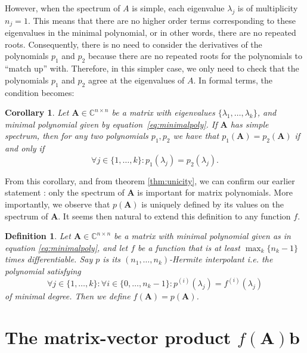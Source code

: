 \documentclass[11pt]{article}
\newtheorem{definition}{Definition}
\newtheorem{corollary}{Corollary}[theorem]
\numberwithin{equation}{section}
\begin{document}
However, when the spectrum of $A$ is simple, each eigenvalue $\lambda_j$ is of multiplicity $n_j=1$. This means that there are no higher order terms corresponding to these eigenvalues in the minimal polynomial, or in other words, there are no repeated roots. Consequently, there is no need to consider the derivatives of the polynomials $p_1$ and $p_2$ because there are no repeated roots for the polynomials to ``match up'' with. Therefore, in this simpler case, we only need to check that the polynomials $p_1$ and $p_2$ agree at the eigenvalues of $A$. In formal terms, the condition becomes:
\begin{corollary}\label{cor:unicity}
Let $\mathbf{A}\in \mathbb{C}^{n\times n}$ be a matrix with eigenvalues $\{\lambda_1,\ldots,\lambda_k\}$, and minimal polynomial given by equation~\ref{eq:minimalpoly}. If $\mathbf{A}$ has simple spectrum, then for any two polynomials $p_1,p_2$ we have that $p_1(\mathbf{A})=p_2(\mathbf{A})$ if and only if
\begin{equation*}
    \forall j\in\{1,\ldots,k\}: p_1(\lambda_j)=p_2(\lambda_j).
\end{equation*}
\end{corollary}
From this corollary, and from theorem \ref{thm:unicity}, we can confirm our earlier statement : only the spectrum of $\mathbf{A}$ is important for matrix polynomials. More importantly, we observe that $p(\mathbf{A})$ is uniquely defined by its values on the spectrum of $\mathbf{A}$. It seems then natural to extend this definition to any function $f$.
\begin{definition}\label{def:Hermite}
    Let $\mathbf{A}\in\mathbb{C}^{n\times n}$ be a matrix with minimal polynomial given as in equation \ref{eq:minimalpoly}, and let $f$ be a function that is at least $\max_k\{n_k-1\}$ times differentiable. Say $p$ is its $(n_1,\ldots,n_k)$-\emph{Hermite interpolant} i.e. the polynomial satisfying
    $$\forall j\in\{1,\ldots,k\}:\forall i\in\{0,\ldots,n_k-1\}: p^{(i)}(\lambda_j)=f^{(i)}(\lambda_j)$$
    of minimal degree. Then we define $f(\mathbf{A})=p(\mathbf{A})$.
\end{definition}
\section{The matrix-vector product $f(\mathbf{A})\mathbf{b}$}
\end{document}
